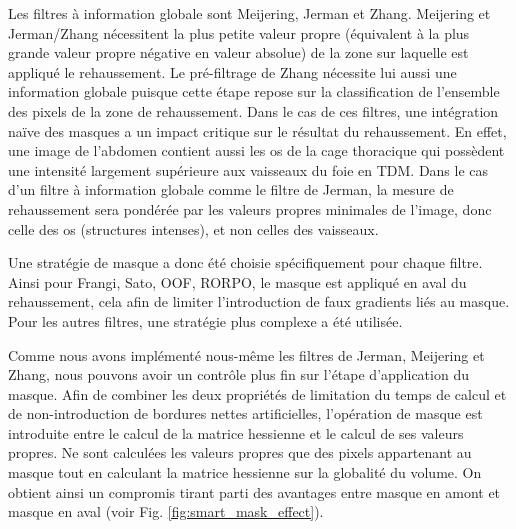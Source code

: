 Les filtres à information globale sont Meijering, Jerman et Zhang. Meijering et Jerman/Zhang nécessitent la plus petite valeur propre (équivalent à la plus grande valeur propre négative en valeur absolue) de la zone sur laquelle est appliqué le rehaussement. Le pré-filtrage de Zhang nécessite lui aussi une information globale puisque cette étape repose sur la classification de l'ensemble des pixels de la zone de rehaussement. Dans le cas de ces filtres, une intégration naïve des masques a un impact critique sur le résultat du rehaussement. En effet, une image de l'abdomen contient aussi les os de la cage thoracique qui possèdent une intensité largement supérieure aux vaisseaux du foie en TDM. Dans le cas d'un filtre à information globale comme le filtre de Jerman, la mesure de rehaussement sera pondérée par les valeurs propres minimales de l'image, donc celle des os (structures intenses), et non celles des vaisseaux. 

Une stratégie de masque a donc été choisie spécifiquement pour chaque filtre. Ainsi pour Frangi, Sato, OOF, RORPO, le masque est appliqué en aval du rehaussement, cela afin de limiter l'introduction de faux gradients liés au masque. Pour les autres filtres, une stratégie plus complexe a été utilisée.

Comme nous avons implémenté nous-même les filtres de Jerman, Meijering et Zhang, nous pouvons avoir un contrôle plus fin sur l'étape d'application du masque. Afin de combiner les deux propriétés de limitation du temps de calcul et de non-introduction de bordures nettes artificielles, l'opération de masque est introduite entre le calcul de la matrice hessienne et le calcul de ses valeurs propres. Ne sont calculées les valeurs propres que des pixels appartenant au masque tout en calculant la matrice hessienne sur la globalité du volume. On obtient ainsi un compromis tirant parti des avantages entre masque en amont et masque en aval (voir Fig. \ref{fig:smart_mask_effect}).

